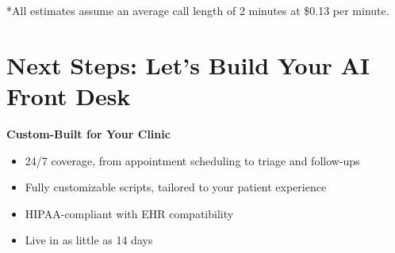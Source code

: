 \documentclass[10pt]{article}
\begin{document}
\vspace{0.4cm}
{\small **All estimates assume an average call length of 2 minutes at \$0.13 per minute.}

\vspace{0.5cm}

\section*{Next Steps: Let’s Build Your AI Front Desk}
\textbf{Custom-Built for Your Clinic}
\begin{itemize}
    \item 24/7 coverage, from appointment scheduling to triage and follow-ups
    \item Fully customizable scripts, tailored to your patient experience
    \item HIPAA-compliant with EHR compatibility
    \item Live in as little as 14 days
\end{itemize}

\vspace{0.4cm}
\begin{center}
\end{center}
\end{document}

